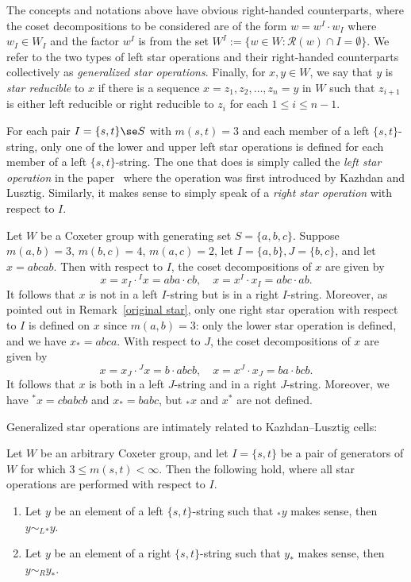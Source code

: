  The concepts and notations above have obvious right-handed counterparts,
 where the coset decompositions to be considered are of the form
 $w=w^I\cdot w_I$ where $w_I\in W_I$ and the factor $w^I$ is from the set $W^I:=\{w\in
 W:\mathcal{R}(w)\cap I=\emptyset\}$. We
 refer to the two types of left star operations and their right-handed
 counterparts collectively as
 \emph{generalized star operations}. Finally, for $x,y\in W$, we say that $y$
 is \emph{star reducible} to $x$ if there is a sequence
 $x=z_1,z_2,\ldots,z_n=y$ in $W$ such that $z_{i+1}$ is either left reducible
 or right reducible to $z_i$ for each $1\le i\le n-1$.

 \begin{rema}
 \label{original star}
 For each pair $I=\{s,t\}\se S$ with $m(s,t)=3$ and each member of a left $\{s,t\}$-string, only one of the lower and upper left star
 operations is defined for
 each member of a left $\{s,t\}$-string. The one that does is simply called
 the \emph{left star operation} in the paper~\cite{KL} where the operation
 was first introduced by Kazhdan and Lusztig. Similarly, it makes sense to
 simply speak of a \emph{right star operation} with respect to $I$. 
 \end{rema}


 \begin{exam}
 \label{star example}
 Let $W$ be a Coxeter group with generating set $S=\{a,b,c\}$. Suppose
 $m(a,b)=3$, $m(b,c)=4$, $m(a,c)=2$, let $I=\{a,b\}, J=\{b,c\}$, and let $x=abcab$. Then with respect to $I$, the coset decompositions of
 $x$ are given by
 \[x= x_I\cdot {}^I x= aba\cdot cb, \quad x= x^I \cdot x_I = abc\cdot ab.\]
 It follows that $x$ is not in a left $I$-string but is in a right $I$-string.
 Moreover, as pointed out in Remark~\ref{original star}, only one right star operation with respect
 to $I$ is defined on $x$ since $m(a,b)=3$: only the lower star
 operation is defined, and we have $x_*=abca$. With respect to
 $J$, the coset decompositions of $x$ are given by 
 \[
 x=x_J\cdot {}^J x=b\cdot abcb, \quad x=x^J\cdot x_J=ba\cdot bcb.\]
 It follows that $x$ is both in a left $J$-string and in a right $J$-string.
 Moreover, we have ${}^{*}x=cbabcb$ and $x_*=babc$, but ${}_*x$ and
 $x^*$ are not defined.
 \end{exam}


 Generalized star operations are intimately related to Kazhdan--Lusztig
 cells:

 \begin{prop} 
 \label{star and cell} 
 Let $W$ be an arbitrary Coxeter group, and let $I=\{s,t\}$ be a pair of
 generators of $W$ for which $3\le m(s,t)<\infty$. Then the following hold,
 where all star operations are performed with respect to $I$.
 \begin{enumerate} 
 \item\label{prop3.3_1} Let $y$ be an element of a left $\{s,t\}$-string such that 
 ${}_*y$ makes sense, then $y\sim_{L}
 {}_* y$. 
 \item\label{prop3.3_2} Let $y$ be an element of a right $\{s,t\}$-string such that 
 $y_*$ makes sense, then $y\sim_{R} y_*$. 
 \end{enumerate} 
 \end{prop}

